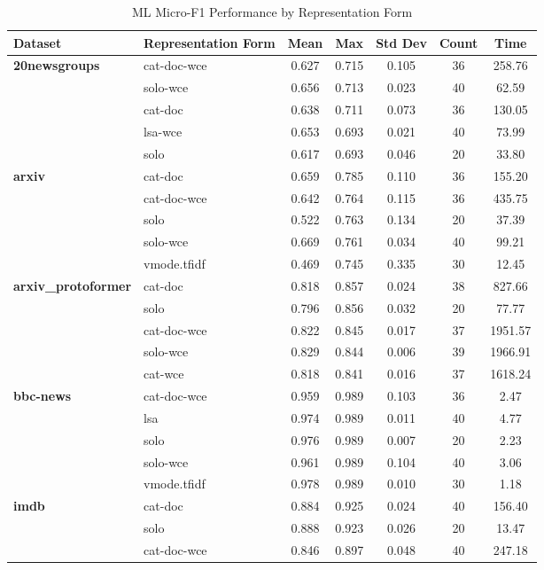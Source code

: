 \documentclass[final]{clv2025-revised}
\begin{document}
\begin{table}[h!]
\centering
\scriptsize
\caption{ML Micro-F1 Performance by Representation Form}
\label{tab:micro_f1_repr_form}
\begin{tabular}{@{}p{2.2cm} p{2.6cm} c c c c c@{}}
\toprule
\textbf{Dataset} & \textbf{Representation Form} & \textbf{Mean} & \textbf{Max} & \textbf{Std Dev} & \textbf{Count} & \textbf{Time} \\
\midrule
\textbf{20newsgroups} & cat-doc-wce & 0.627 & 0.715 & 0.105 & 36 & 258.76 \\
 & solo-wce & 0.656 & 0.713 & 0.023 & 40 & 62.59 \\
 & cat-doc & 0.638 & 0.711 & 0.073 & 36 & 130.05 \\
 & lsa-wce & 0.653 & 0.693 & 0.021 & 40 & 73.99 \\
 & solo & 0.617 & 0.693 & 0.046 & 20 & 33.80 \\
\midrule
\textbf{arxiv} & cat-doc & 0.659 & 0.785 & 0.110 & 36 & 155.20 \\
 & cat-doc-wce & 0.642 & 0.764 & 0.115 & 36 & 435.75 \\
 & solo & 0.522 & 0.763 & 0.134 & 20 & 37.39 \\
 & solo-wce & 0.669 & 0.761 & 0.034 & 40 & 99.21 \\
 & vmode.tfidf & 0.469 & 0.745 & 0.335 & 30 & 12.45 \\
\midrule
\textbf{arxiv\_protoformer} & cat-doc & 0.818 & 0.857 & 0.024 & 38 & 827.66 \\
 & solo & 0.796 & 0.856 & 0.032 & 20 & 77.77 \\
 & cat-doc-wce & 0.822 & 0.845 & 0.017 & 37 & 1951.57 \\
 & solo-wce & 0.829 & 0.844 & 0.006 & 39 & 1966.91 \\
 & cat-wce & 0.818 & 0.841 & 0.016 & 37 & 1618.24 \\
\midrule
\textbf{bbc-news} & cat-doc-wce & 0.959 & 0.989 & 0.103 & 36 & 2.47 \\
 & lsa & 0.974 & 0.989 & 0.011 & 40 & 4.77 \\
 & solo & 0.976 & 0.989 & 0.007 & 20 & 2.23 \\
 & solo-wce & 0.961 & 0.989 & 0.104 & 40 & 3.06 \\
 & vmode.tfidf & 0.978 & 0.989 & 0.010 & 30 & 1.18 \\
\midrule
\textbf{imdb} & cat-doc & 0.884 & 0.925 & 0.024 & 40 & 156.40 \\
 & solo & 0.888 & 0.923 & 0.026 & 20 & 13.47 \\
 & cat-doc-wce & 0.846 & 0.897 & 0.048 & 40 & 247.18 \\

\end{tabular}
\end{table}
\end{document}
